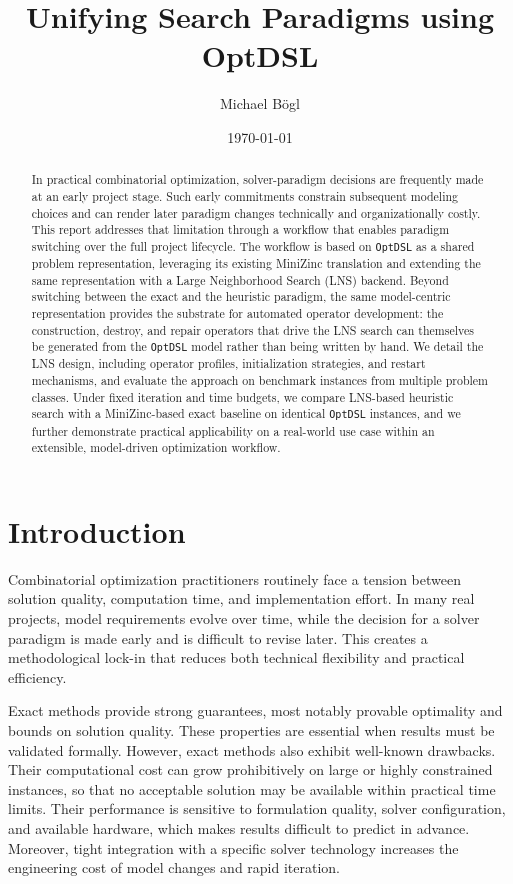 \documentclass[11pt,a4paper]{article}
\title{Unifying Search Paradigms using OptDSL}
\author{
  Michael Bögl
}
\date{\today}
\begin{document}
\maketitle

\begin{abstract}
In practical combinatorial optimization, solver-paradigm decisions are frequently made at an early project stage.
Such early commitments constrain subsequent modeling choices and can render later paradigm changes technically and organizationally costly.
This report addresses that limitation through a workflow that enables paradigm switching over the full project lifecycle.
The workflow is based on \texttt{OptDSL} as a shared problem representation, leveraging its existing MiniZinc translation and extending the same representation with a Large Neighborhood Search (LNS) backend.
Beyond switching between the exact and the heuristic paradigm, the same model-centric representation provides the substrate for automated operator development: the construction, destroy, and repair operators that drive the LNS search can themselves be generated from the \texttt{OptDSL} model rather than being written by hand.
We detail the LNS design, including operator profiles, initialization strategies, and restart mechanisms, and evaluate the approach on benchmark instances from multiple problem classes.
Under fixed iteration and time budgets, we compare LNS-based heuristic search with a MiniZinc-based exact baseline on identical \texttt{OptDSL} instances, and we further demonstrate practical applicability on a real-world use case within an extensible, model-driven optimization workflow.
\end{abstract}

\section{Introduction}
Combinatorial optimization practitioners routinely face a tension between solution quality, computation time, and implementation effort.
In many real projects, model requirements evolve over time, while the decision for a solver paradigm is made early and is difficult to revise later.
This creates a methodological lock-in that reduces both technical flexibility and practical efficiency.

Exact methods provide strong guarantees, most notably provable optimality and bounds on solution quality.
These properties are essential when results must be validated formally.
However, exact methods also exhibit well-known drawbacks.
Their computational cost can grow prohibitively on large or highly constrained instances, so that no acceptable solution may be available within practical time limits.
Their performance is sensitive to formulation quality, solver configuration, and available hardware, which makes results difficult to predict in advance.
Moreover, tight integration with a specific solver technology increases the engineering cost of model changes and rapid iteration.
\end{document}

